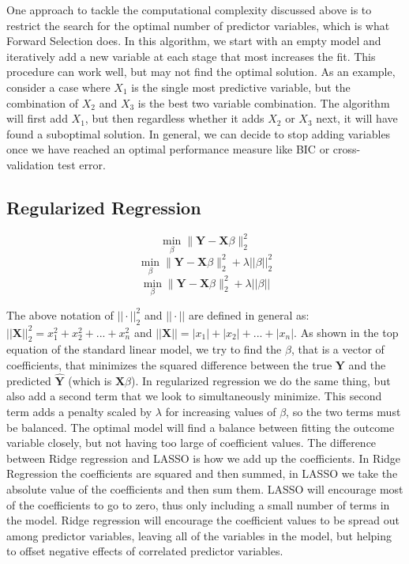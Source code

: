 \documentclass{article}
\newcommand{\bX}{\mathbf{X}}
\newcommand{\bY}{\mathbf{Y}}
\begin{document}
One approach to tackle the computational complexity discussed above is to restrict the search for the optimal number of 
predictor variables, which is what Forward Selection does. In this algorithm, we start with an empty model and iteratively add a 
new variable at each stage that most increases the fit. This procedure can work well, but may not find the optimal solution. As 
an example, consider a case where $X_1$ is the single most predictive variable, but the combination of $X_2$ and $X_3$ is 
the best two variable combination. The algorithm will first add $X_1$, but then regardless whether it adds $X_2$ or $X_3$ next, 
it will have found a suboptimal solution. In general, we can decide to stop adding variables once we have reached an optimal 
performance measure like BIC or cross-validation test error.

\pagebreak

\subsection{Regularized Regression}

	\[\min_{\beta}  \|\bY - \bX\beta\|_{2}^{2} \tag{linear model}\]
	\[\min_{\beta}  \|\bY - \bX\beta\|_{2}^{2} + \lambda||\beta||_2^2 \tag{ridge regression}\]
	\[\min_{\beta}  \|\bY - \bX\beta\|_{2}^{2} + \lambda||\beta|| \tag{LASSO}\]

The above notation of $||\cdot||_{2}^{2}$ and  $||\cdot||$ are defined in general as: $||\bX||_{2}^{2} = x_1^2 + x_2^2 + ... + 
x_n^2$ and $||\bX|| = |x_1| + |x_2| + ... + |x_n|$. As shown in the top equation of the standard linear model, we try to find the $\beta$, that is a vector of coefficients,  
that minimizes the squared difference between the true $\bY$ and the predicted $\hat{\bY}$ (which is $\bX\beta$). In 
regularized regression we do the same thing, but also add a second term that we look to simultaneously minimize. This second 
term adds a penalty scaled by $\lambda$ for increasing values of $\beta$, so the two terms must be balanced. The optimal model will find a balance 
between fitting the outcome variable closely, but not having too large of coefficient values. The difference between Ridge 
regression and LASSO is how we add up the coefficients. In Ridge Regression the coefficients are squared and then summed, 
in LASSO we take the absolute value of 
the coefficients and then sum them. LASSO will encourage most of the coefficients to go to zero, thus only including a small 
number of terms in the model. Ridge regression will encourage the coefficient values to be spread out among predictor 
variables, leaving all of the variables in the model, but helping to offset negative effects of correlated predictor variables. 
\end{document}
